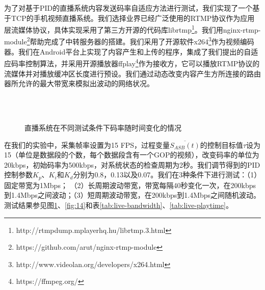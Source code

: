 为了对基于PID的直播系统内容发送码率自适应方法进行测试，我们实现了一个基于TCP的手机视频直播系统。我们选择业界已经广泛使用的RTMP协议作为应用层流媒体协议，具体实现采用了第三方开源的代码库librtmp\footnote{http://rtmpdump.mplayerhq.hu/librtmp.3.html}。我们用nginx-rtmp-module\footnote{https://github.com/arut/nginx-rtmp-module}帮助完成了中转服务器的搭建。我们采用了开源软件x264\footnote{http://www.videolan.org/developers/x264.html}作为视频编码器。我们在Android平台上实现了内容产生和上传的程序，集成了我们提出的自适应码率控制算法，并采用开源播放器ffplay\footnote{https://ffmpeg.org/}作为接收方，它可以播放RTMP协议的流媒体并对播放缓冲区长度进行预设。我们通过动态改变内容产生方所连接的路由器所允许的最大带宽来模拟出波动的网络状况。

\begin{figure}[!t]
	\centering
	 \\
	 \\
	\caption{直播系统在不同测试条件下码率随时间变化的情况}
	\label{fig:09}
\end{figure}

在我们的实验中，采集帧率设置为15 FPS，过程变量$\overline{S_{ASB}(t)}$的控制目标值$\tau$设为15（单位是数据段的个数，每个数据段含有一个GOP的视频），改变码率的单位为20kbps，初始码率为500kbps，对系统状态的检查周期为2秒。我们调节得到的PID控制参数$K_p$、$K_i$和$K_d$分别为0.8，0.13以及0.07。我们在3种条件下进行测试：（1）固定带宽为1Mbps；
（2）长周期波动带宽，带宽每隔40秒变化一次，在200kbps到1.4Mbps之间波动；（3）短周期波动带宽，在200kbps到1.4Mbps之间随机波动。测试结果参见图\ref{fig:09}、\ref{fig:14}和表\ref{tab:live-bandwidth}、\ref{tab:live-playtime}。

